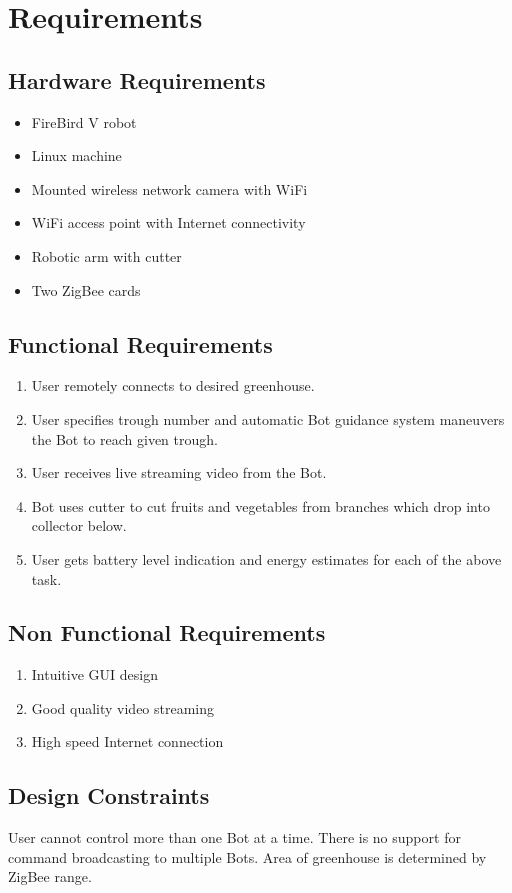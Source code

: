 \documentclass[a4paper, 12pt]{article}
\begin{document}
\section{Requirements}
\subsection{Hardware Requirements}
\begin{itemize}
 \item FireBird V robot
 \item Linux machine
 \item Mounted wireless network camera with WiFi
 \item WiFi access point with Internet connectivity
 \item Robotic arm with cutter
 \item Two ZigBee cards
\end{itemize}

\subsection{Functional Requirements}
\begin{enumerate}
 \item User remotely connects to desired greenhouse.
 \item User specifies trough number and automatic Bot guidance system maneuvers the Bot to reach given trough.
 \item User receives live streaming video from the Bot.
 \item Bot uses cutter to cut fruits and vegetables from branches which drop into collector below.
 \item User gets battery level indication and energy estimates for each of the above task.
\end{enumerate}

\subsection{Non Functional Requirements}
\begin{enumerate}
 \item Intuitive GUI design
 \item Good quality video streaming
 \item High speed Internet connection
\end{enumerate}

\subsection{Design Constraints}
User cannot control more than one Bot at a time. There is no support for command broadcasting to multiple Bots.
Area of greenhouse is determined by ZigBee range.
\end{document}

